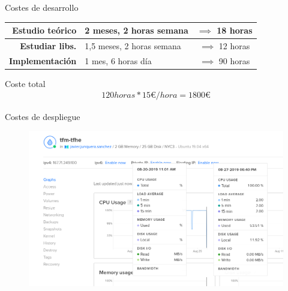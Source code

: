 \documentclass{beamer}
\begin{document}
\begin{frame}{Costes de desarrollo}

    \begin{table}[]
        \centering
        \begin{tabular}{| r | l c | }
            \hline
            \textbf{Estudio teórico} & 2 meses, 2 horas semana   & $\implies$ 18 horas \\
            \hline
            \textbf{Estudiar libs.} & 1,5 meses, 2 horas semana &  $\implies$ 12 horas \\
            \hline
            \textbf{Implementación} & 1 mes, 6 horas día     & $\implies$ 90 horas \\
            \hline
        \end{tabular}
    \end{table}
    
    \begin{block}{Coste total}
        \vspace*{-5pt}\setlength\belowdisplayshortskip{15pt}
        \begin{align*}
        120 horas * 15 \euro/hora = 1800 \euro  
        \end{align*}
    \end{block}{}

\end{frame}


\begin{frame}{Costes de despliegue}

    \begin{figure}[H]
        \includegraphics[width=\textwidth]{stats-do}
    \end{figure}
    
\end{frame}
\end{document}
